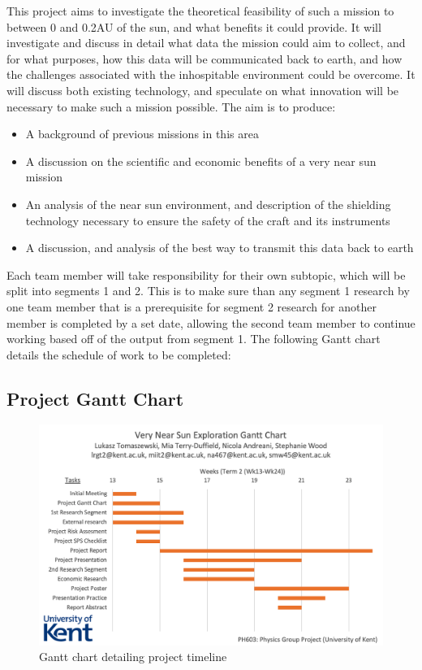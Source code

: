 \documentclass[12pt]{article}
\begin{document}
\vspace{5mm}

This project aims to investigate the theoretical feasibility of such a mission to between 0 and 0.2AU of the sun, and what benefits it could provide. It will investigate and discuss in detail what data the mission could aim to collect, and for what purposes, how this data will be communicated back to earth, and how the challenges associated with the inhospitable environment could be overcome. It will discuss both existing technology, and speculate on what innovation will be necessary to make such a mission possible. The aim is to produce: 

\begin{itemize}
    \item A background of previous missions in this area
    \item A discussion on the scientific and economic benefits of a very near sun mission
    \item An analysis of the near sun environment, and description of the shielding technology necessary to ensure the safety of the craft and its instruments
    \item A discussion, and analysis of the best way to transmit this data back to earth
\end{itemize}

Each team member will take responsibility for their own subtopic, which will be split into segments 1 and 2. This is to make sure than any segment 1 research by one team member that is a prerequisite for segment 2 research for another member is completed by a set date, allowing the second team member to continue working based off of the output from segment 1. The following Gantt chart details the schedule of work to be completed:

\subsection{Project Gantt Chart}
\label{Gantt Chart}

\begin{figure}[H]
\centering
\includegraphics[width = 17cm]{Media/Document/gantt.png}
\caption{Gantt chart detailing project timeline}
\label{gantt}
\end{figure}
\end{document}
